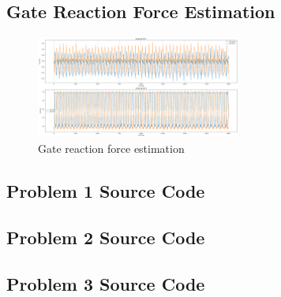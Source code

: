 \documentclass[12pt]{article}
\begin{document}
\subsection{Gate Reaction Force Estimation} \label{sec:appendix-gate-rx-frc-est}
\begin{figure}[H]
    \centering
    \includegraphics[angle=90, width=0.6\textwidth]{Problem 3/out/predictions.png}
    \caption{Gate reaction force estimation}
    \label{fig:p3-gate-rx-frc-est}
\end{figure}

\clearpage
\subsection{Problem 1 Source Code} \label{appendix-p1-code}

\clearpage
\subsection{Problem 2 Source Code} \label{appendix-p2-code}

\clearpage
\subsection{Problem 3 Source Code} \label{appendix-p3-code}

\end{document}
